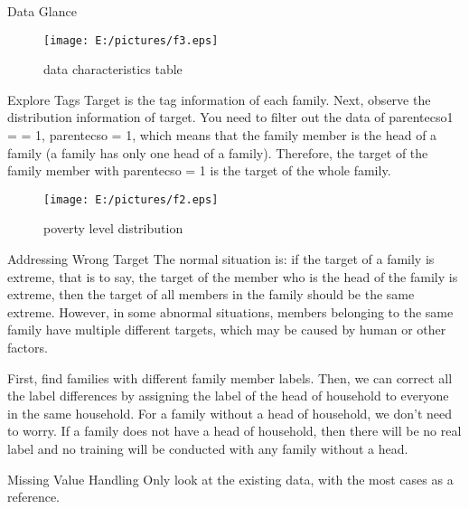 \documentclass[
 size=12pt,
 paper=smartboard, %
 mode=present, %
 display=slides, %
style=tuliplab,
pauseslide,
fleqn,leqno]{powerdot}
\begin{document}
    \begin{slide}[toc=,bm=]{Data Glance}
     \begin{figure}[ht]
      \centering
      \texttt{[image: E:/pictures/f3.eps]}
      \caption{data characteristics table}
      \end{figure}
    \end{slide}
    \begin{slide}{Explore Tags }
      \setlength{\parindent}{1.5em}
      Target is the tag information of each family. Next, observe the distribution information of target. You need to filter out the data of parentecso1 = = 1, parentecso = 1, which means that the family member is the head of a family (a family has only one head of a family). Therefore, the target of the family member with parentecso = 1 is the target of the whole family.
      
      
     
      \begin{figure}[ht]%
        \centering%
        \texttt{[image: E:/pictures/f2.eps]}
        \caption{poverty level distribution}%
        \end{figure} 

    \end{slide} 
\begin{slide}{Addressing Wrong Target}
  \setlength{\parindent}{1.5em}
  The normal situation is: if the target of a family is extreme, that is to say, the target of the member who is the head of the family is extreme, then the target of all members in the family should be the same extreme. However, in some abnormal situations, members belonging to the same family have multiple different targets, which may be caused by human or other factors.

First, find families with different family member labels. Then, we can correct all the label differences by assigning the label of the head of household to everyone in the same household. For a family without a head of household, we don't need to worry. If a family does not have a head of household, then there will be no real label and no training will be conducted with any family without a head.
  \vspace{1cm}
  
\end{slide}

\begin{slide}{Missing Value Handling}
  \setlength{\parindent}{1.5em}
  Only look at the existing data, with the most cases as a reference.
\vspace{0.9cm}

\end{slide}
\end{document}
